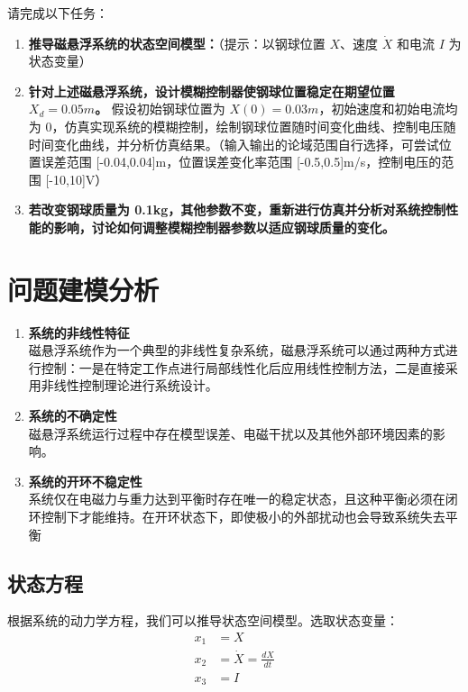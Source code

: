 \documentclass[12pt,a4paper,UTF8]{article}
\begin{document}
请完成以下任务：
\begin{problem}
\begin{enumerate}
\item \textbf{推导磁悬浮系统的状态空间模型：}（提示：以钢球位置 $X$、速度 $\dot{X}$ 和电流 $I$ 为状态变量）

\item \textbf{针对上述磁悬浮系统，设计模糊控制器使钢球位置稳定在期望位置 $X_d = 0.05m$。} 假设初始钢球位置为 $X(0) = 0.03m$，初始速度和初始电流均为 0，仿真实现系统的模糊控制，绘制钢球位置随时间变化曲线、控制电压随时间变化曲线，并分析仿真结果。（输入输出的论域范围自行选择，可尝试位置误差范围 [-0.04,0.04]m，位置误差变化率范围 [-0.5,0.5]m/s，控制电压的范围 [-10,10]V）

\item \textbf{若改变钢球质量为 0.1kg，其他参数不变，重新进行仿真并分析对系统控制性能的影响，讨论如何调整模糊控制器参数以适应钢球质量的变化。}
\end{enumerate}
\end{problem}

\section{问题建模分析}
\begin{enumerate}
\item \textbf{系统的非线性特征}\\
磁悬浮系统作为一个典型的非线性复杂系统，磁悬浮系统可以通过两种方式进行控制：一是在特定工作点进行局部线性化后应用线性控制方法，二是直接采用非线性控制理论进行系统设计。

\item \textbf{系统的不确定性}\\
磁悬浮系统运行过程中存在模型误差、电磁干扰以及其他外部环境因素的影响。

\item \textbf{系统的开环不稳定性}\\
系统仅在电磁力与重力达到平衡时存在唯一的稳定状态，且这种平衡必须在闭环控制下才能维持。在开环状态下，即使极小的外部扰动也会导致系统失去平衡
\end{enumerate}
    

\subsection{状态方程}
根据系统的动力学方程，我们可以推导状态空间模型。选取状态变量：
\begin{equation}
\begin{aligned}
x_1 &= X \\
x_2 &= \dot{X} = \frac{dX}{dt} \\
x_3 &= I
\end{aligned}
\end{equation}
\end{document}
